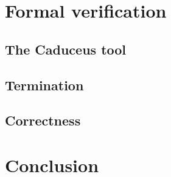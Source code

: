 \documentclass[a4paper]{llncs}
\begin{document}
\section{Formal verification}

\subsection{The Caduceus tool}

\cite{caduceus,FilliatreMarche04} \cite{why}

\cite{simplify} \cite{yices} \cite{ergo} \cite{coq}

\subsection{Termination}

\subsection{Correctness}

\section{Conclusion}

\nocite{*}


\end{document}
